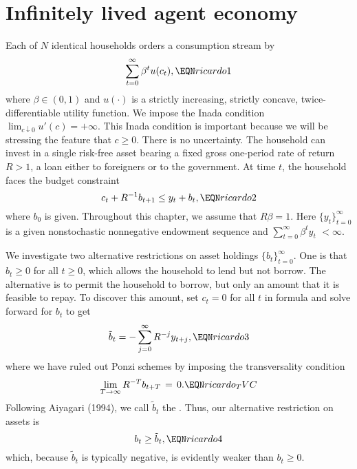 \section{Infinitely lived agent economy}

Each of $N$ identical
households orders a consumption stream by
$$ \sum_{t=0}^\infty \beta^t u(c_t), \EQN ricardo1 $$
where $\beta \in (0,1)$ and $u(\cdot)$ is a strictly  increasing,
strictly concave, twice-differentiable
utility function.
We impose the Inada condition
$ \lim_{c \downarrow 0} u'(c) = +\infty.$
This Inada condition is important  because we will be stressing
the feature that $c \geq 0$.  There is no uncertainty.
The household can invest in a single risk-free asset bearing a fixed gross
one-period rate of return $R>1$, a loan either to foreigners or to the
government.  At time $t$, the household faces the budget
constraint
$$ c_t + R^{-1} b_{t+1} \leq y_t + b_t,  \EQN ricardo2$$
where $b_0$ is given.   Throughout this chapter,
we assume that $R \beta =1$.  Here
$\{y_t\}_{t=0}^\infty$ is a given nonstochastic
nonnegative endowment sequence and
$ \sum_{t=0}^\infty \beta^t y_t$
$< \infty$.

We   investigate two alternative restrictions on asset holdings
$\{b_t\}_{t=0}^\infty$.  One is that
$b_t \geq 0$ for all $t \geq 0$, which allows
the household to lend but not borrow.  The alternative
is to  permit the household to borrow, but only an amount
that it is feasible to repay.     To discover this amount,
set $c_t=0$ for all $t$ in formula  and solve forward for
$b_t$ to get
$$ \tilde b_t = - \sum_{j=0}^\infty R^{-j} y_{t+j},   \EQN ricardo3 $$
where we have ruled out Ponzi schemes by imposing the transversality condition
$$
\lim_{T\to\infty} R^{-T} b_{t+T} \,=\, 0.            \EQN ricardo_TVC
$$
Following Aiyagari (1994),
 we call $\tilde b_t$ the
{\it {}}. Thus, our alternative restriction
on assets is
$$ b_t \geq \tilde b_t , \EQN ricardo4 $$
which, because $\tilde b_t$ is typically negative,  is evidently weaker than $b_t \geq 0$.

